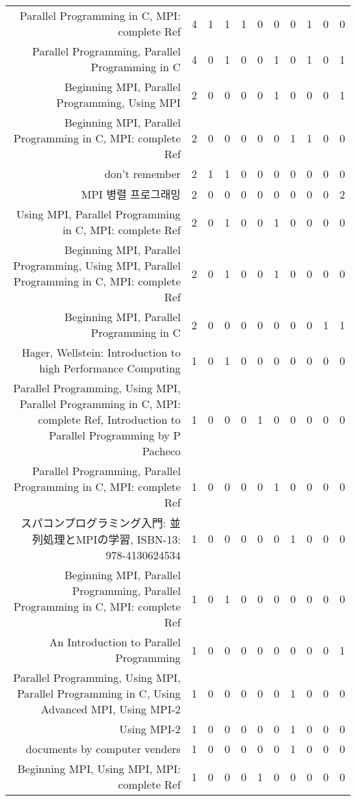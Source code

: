 {\begin{landscape}
\begin{longtable}[htb]{r|c|c|c|c|c|c|c|c|c|c}
{Parallel Programming in C, MPI: complete Ref} & 4 & 1 & 1 & 1 & 0 & 0 & 0 & 1 & 0 & 0 \\%
{Parallel Programming, Parallel Programming in C} & 4 & 0 & 1 & 0 & 0 & 1 & 0 & 1 & 0 & 1 \\%
{Beginning MPI, Parallel Programming, Using MPI} & 2 & 0 & 0 & 0 & 0 & 1 & 0 & 0 & 0 & 1 \\%
{Beginning MPI, Parallel Programming in C, MPI: complete Ref} & 2 & 0 & 0 & 0 & 0 & 0 & 1 & 1 & 0 & 0 \\%
{don't remember} & 2 & 1 & 1 & 0 & 0 & 0 & 0 & 0 & 0 & 0 \\%
{MPI 병렬 프로그래밍} & 2 & 0 & 0 & 0 & 0 & 0 & 0 & 0 & 0 & 2 \\%
{Using MPI, Parallel Programming in C, MPI: complete Ref} & 2 & 0 & 1 & 0 & 0 & 1 & 0 & 0 & 0 & 0 \\%
{Beginning MPI, Parallel Programming, Using MPI, Parallel Programming in C, MPI: complete Ref} & 2 & 0 & 1 & 0 & 0 & 1 & 0 & 0 & 0 & 0 \\%
{Beginning MPI, Parallel Programming in C} & 2 & 0 & 0 & 0 & 0 & 0 & 0 & 0 & 1 & 1 \\%
{Hager, Wellstein: Introduction to high Performance Computing} & 1 & 0 & 1 & 0 & 0 & 0 & 0 & 0 & 0 & 0 \\%
{Parallel Programming, Using MPI, Parallel Programming in C, MPI: complete Ref, Introduction to Parallel Programming by P Pacheco} & 1 & 0 & 0 & 0 & 1 & 0 & 0 & 0 & 0 & 0 \\%
{Parallel Programming, Parallel Programming in C, MPI: complete Ref} & 1 & 0 & 0 & 0 & 0 & 1 & 0 & 0 & 0 & 0 \\%
{スパコンプログラミング入門: 並列処理とMPIの学習, ISBN-13: 978-4130624534} & 1 & 0 & 0 & 0 & 0 & 0 & 1 & 0 & 0 & 0 \\%
{Beginning MPI, Parallel Programming, Parallel Programming in C, MPI: complete Ref} & 1 & 0 & 1 & 0 & 0 & 0 & 0 & 0 & 0 & 0 \\%
{An Introduction to Parallel Programming} & 1 & 0 & 0 & 0 & 0 & 0 & 0 & 0 & 0 & 1 \\%
{Parallel Programming, Using MPI, Parallel Programming in C, Using Advanced MPI, Using MPI-2} & 1 & 0 & 0 & 0 & 0 & 0 & 1 & 0 & 0 & 0 \\%
{Using MPI-2} & 1 & 0 & 0 & 0 & 0 & 0 & 1 & 0 & 0 & 0 \\%
{documents by computer venders} & 1 & 0 & 0 & 0 & 0 & 0 & 1 & 0 & 0 & 0 \\%
{Beginning MPI, Using MPI, MPI: complete Ref} & 1 & 0 & 0 & 0 & 1 & 0 & 0 & 0 & 0 & 0 \\%

\end{longtable}
\end{landscape}}
